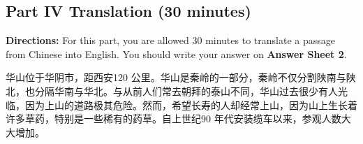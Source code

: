 \documentclass[UTF8,11pt]{ctexart}
\begin{document}
\subsection*{\textbf{Part} IV \textbf{Translation} \textbf{(30 minutes)}}


\textbf{Directions:} For this part, you are allowed 30 minutes to translate a passage from Chinese into English. You should write your answer on\textbf{ Answer Sheet 2}.


华山位于华阴市，距西安120 公里。华山是秦岭的一部分，秦岭不仅分割陕南与陕北，也分隔华南与华北。与从前人们常去朝拜的泰山不同，华山过去很少有人光临，因为上山的道路极其危险。然而，希望长寿的人却经常上山，因为山上生长着许多草药，特别是一些稀有的药草。自上世纪90 年代安装缆车以来，参观人数大大增加。
\end{document}
